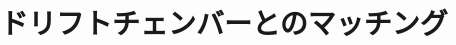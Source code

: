 \documentclass[report]{jsbook}
\begin{document}
\section{ドリフトチェンバーとのマッチング}


\begin{comment}
・文献の引用の仕方

データは参考文献\cite{rika} にあったものを使った．
この文献\cite{ten}も参考にした。

・図の挿入の仕方
\begin{figure}[h]
\begin{center}
\texttt{[image: ./plot1.pdf]}
\caption{サイン関数のグラフ}
\end{center}
\end{figure}


\begin{verbatim}
#include <iostream>
using namespace std;
int main() {
for(int i = 1; i <= 5; i++) {
cout << "こんにちは" << i << endl;
}
return 0;
}
\end{verbatim}
\verb|\usepackage{ascmac}|して\verb|screen| 環境を使うと，枠がつきます。
\begin{screen}
\begin{verbatim}
#include <iostream>
using namespace std;
int main() {
for(int i = 1; i <= 5; i++) {
cout << "こんにちは" << i << endl;
}
return 0;
}
\end{verbatim}
\end{screen}

\begin{thebibliography}{99}
\bibitem{rika} 国立天文台編，理科年表 (丸善)
\bibitem{ten} 天文年鑑，誠文堂新光社。
\end{thebibliography}

\end{comment}
\end{document}
